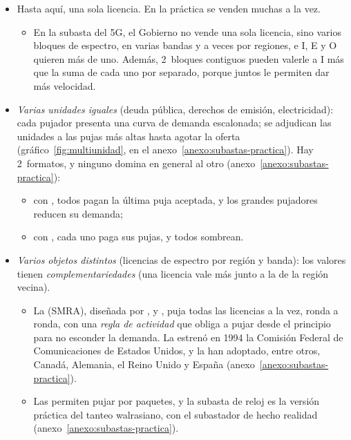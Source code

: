 \documentclass[11pt]{article}
\begin{document}
\begin{itemize}
\item Hasta aquí, una sola licencia. En la práctica se venden muchas a la vez.
  \begin{itemize}
  \item En la subasta del 5G, el Gobierno no vende una sola licencia, sino varios bloques de espectro, en varias bandas y a veces por regiones, e \textup{I}, E y O quieren más de uno. Además, 2~bloques contiguos pueden valerle a \textup{I} más que la suma de cada uno por separado, porque juntos le permiten dar más velocidad.
  \end{itemize}
\item \emph{Varias unidades iguales} (deuda pública, derechos de emisión, electricidad): cada pujador presenta una curva de demanda escalonada; se adjudican las unidades a las pujas más altas hasta agotar la oferta (gráfico~\ref{fig:multiunidad}, en el anexo~\ref{anexo:subastas-practica}). Hay 2~formatos, y ninguno domina en general al otro (anexo~\ref{anexo:subastas-practica}):
  \begin{itemize}
  \item con , todos pagan la última puja aceptada, y los grandes pujadores reducen su demanda;
  \item con , cada uno paga sus pujas, y todos sombrean.
  \end{itemize}
\item \emph{Varios objetos distintos} (licencias de espectro por región y banda): los valores tienen \emph{complementariedades} (una licencia vale más junto a la de la región vecina).
  \begin{itemize}
  \item La  (SMRA), diseñada por ,  y , puja todas las licencias a la vez, ronda a ronda, con una \emph{regla de actividad} que obliga a pujar desde el principio para no esconder la demanda\nocite{Milgrom2004Putting}. La estrenó en 1994 la Comisión Federal de Comunicaciones de Estados Unidos, y la han adoptado, entre otros, Canadá, Alemania, el Reino Unido y España\nocite{Nobel2020Scientific} (anexo~\ref{anexo:subastas-practica}).
  \item Las  permiten pujar por paquetes, y la subasta de reloj es la versión práctica del tanteo walrasiano, con el subastador de  hecho realidad  (anexo~\ref{anexo:subastas-practica}).

\end{itemize}
\end{itemize}
\end{document}
